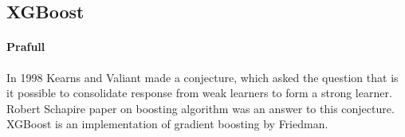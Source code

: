 \documentclass[runningheads]{llncs}
\begin{document}
\subsection{XGBoost}
\paragraph{Prafull}In 1998 Kearns and Valiant made a conjecture, which asked the question that is it possible to consolidate response from weak learners to form a strong learner. Robert Schapire paper on boosting algorithm was an answer to this conjecture. XGBoost is an implementation of gradient boosting by Friedman.

\end{document}

